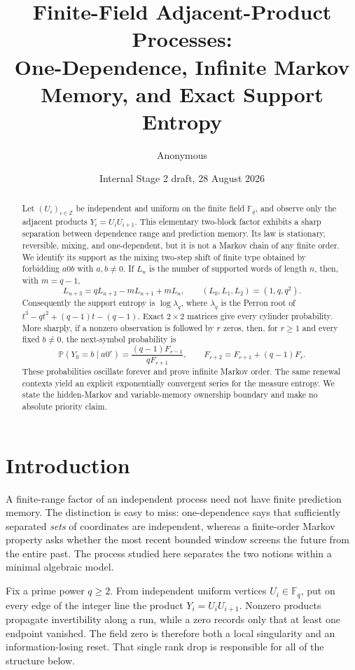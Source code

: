 \documentclass[11pt,a4paper]{amsart}
\title[Finite-field adjacent-product processes]{Finite-Field Adjacent-Product Processes:\\
One-Dependence, Infinite Markov Memory, and Exact Support Entropy}
\author{Anonymous}
\date{Internal Stage 2 draft, 28 August 2026}
\theoremstyle{definition}
\theoremstyle{remark}
\newcommand{\F}{\mathbb F}
\newcommand{\Z}{\mathbb Z}
\newcommand{\Prob}{\mathbb P}
\begin{document}
\begin{abstract}
Let $(U_i)_{i\in\Z}$ be independent and uniform on the finite field
$\F_q$, and observe only the adjacent products
$Y_i=U_iU_{i+1}$.  This elementary two-block factor exhibits a sharp
separation between dependence range and prediction memory.  Its law is
stationary, reversible, mixing, and one-dependent, but it is not a Markov
chain of any finite order.  We identify its support as the mixing two-step
shift of finite type obtained by forbidding $a0b$ with $a,b\ne0$.  If $L_n$
is the number of supported words of length $n$, then, with $m=q-1$,
\[
 L_{n+3}=qL_{n+2}-mL_{n+1}+mL_n,
 \qquad
 (L_0,L_1,L_2)=(1,q,q^2).
\]
Consequently the support entropy is $\log\lambda_q$, where $\lambda_q$ is
the Perron root of
$t^3-qt^2+(q-1)t-(q-1)$.  Exact $2\times2$ matrices give every cylinder
probability.  More sharply, if a nonzero observation is followed by $r$
zeros, then, for $r\geq1$ and every fixed $b\ne0$, the next-symbol probability is
\[
 \Prob(Y_0=b\mid a0^r)
 =\frac{(q-1)F_{r-1}}{qF_{r+1}},
 \qquad F_{r+2}=F_{r+1}+(q-1)F_r.
\]
These probabilities oscillate forever and prove infinite Markov order.
The same renewal contexts yield an explicit exponentially convergent series
for the measure entropy.  We state the hidden-Markov and variable-memory
ownership boundary and make no absolute priority claim.
\end{abstract}

\maketitle

\section{Introduction}

A finite-range factor of an independent process need not have finite
prediction memory.  The distinction is easy to miss: one-dependence says
that sufficiently separated \emph{sets} of coordinates are independent,
whereas a finite-order Markov property asks whether the most recent bounded
window screens the future from the entire past.  The process studied here
separates the two notions within a minimal algebraic model.

Fix a prime power $q\geq2$.  From independent uniform vertices
$U_i\in\F_q$, put on every edge of the integer line the product
$Y_i=U_iU_{i+1}$.  Nonzero products propagate invertibility along a run,
while a zero records only that at least one endpoint vanished.  The field
zero is therefore both a local singularity and an information-losing reset.
That single rank drop is responsible for all of the structure below.
\end{document}
